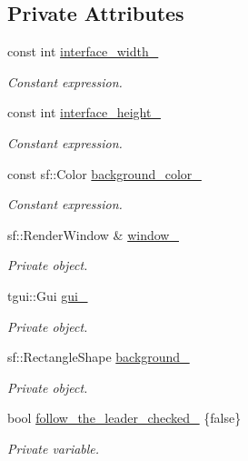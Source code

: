 \subsection*{Private Attributes}
\begin{DoxyCompactItemize}
\item 
const int \hyperlink{classGraphicalUserInterface_ae3c07ea59e557909f92882028fafb0a3}{interface\+\_\+width\+\_\+}
\begin{DoxyCompactList}\small\item\em Constant expression. \end{DoxyCompactList}\item 
const int \hyperlink{classGraphicalUserInterface_a2e867c6d5b0d903d9e16e9934af93fc1}{interface\+\_\+height\+\_\+}
\begin{DoxyCompactList}\small\item\em Constant expression. \end{DoxyCompactList}\item 
const sf\+::\+Color \hyperlink{classGraphicalUserInterface_a0361d82710bb150c272a2a760164241f}{background\+\_\+color\+\_\+}
\begin{DoxyCompactList}\small\item\em Constant expression. \end{DoxyCompactList}\item 
sf\+::\+Render\+Window \& \hyperlink{classGraphicalUserInterface_ae51adeb759a97196eda3b37bfc80a452}{window\+\_\+}
\begin{DoxyCompactList}\small\item\em Private object. \end{DoxyCompactList}\item 
tgui\+::\+Gui \hyperlink{classGraphicalUserInterface_ab07abda0fdb8e2965b70d2024fa3cf20}{gui\+\_\+}
\begin{DoxyCompactList}\small\item\em Private object. \end{DoxyCompactList}\item 
sf\+::\+Rectangle\+Shape \hyperlink{classGraphicalUserInterface_a6d706ef82ec59d143a009331b40681bb}{background\+\_\+}
\begin{DoxyCompactList}\small\item\em Private object. \end{DoxyCompactList}\item 
bool \hyperlink{classGraphicalUserInterface_a57fe5ef98f53a222aab96d191e869ad3}{follow\+\_\+the\+\_\+leader\+\_\+checked\+\_\+} \{false\}
\begin{DoxyCompactList}\small\item\em Private variable. \end{DoxyCompactList}\end{DoxyCompactItemize}
